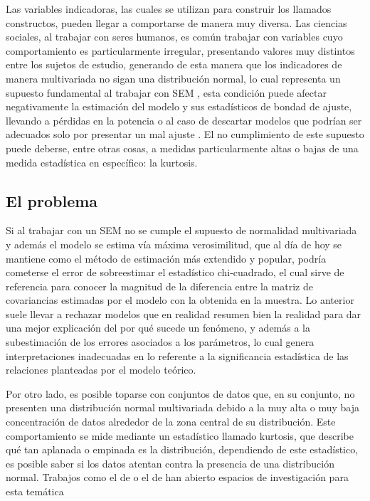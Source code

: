 \documentclass[english]{revcoles}
\begin{document}
Las variables indicadoras, las cuales se utilizan para construir los llamados constructos, pueden llegar a comportarse de manera muy diversa. Las ciencias sociales, al trabajar con seres humanos, es común trabajar con variables cuyo comportamiento es particularmente irregular, presentando valores muy distintos entre los sujetos de estudio, generando de esta manera que los indicadores de manera multivariada no sigan una distribución normal, lo cual representa un supuesto fundamental al trabajar con SEM \cite{SuraFonseca2020}, esta condición puede afectar negativamente la estimación del modelo y sus estadísticos de bondad de ajuste, llevando a pérdidas en la potencia \cite{Foss2011} o al caso de descartar modelos que podrían ser adecuados solo por presentar un mal ajuste \cite{Andreassen2006}. El no cumplimiento de este supuesto puede deberse, entre otras cosas, a medidas particularmente altas o bajas de una medida estadística en específico: la kurtosis.

\subsection{El problema}

Si al trabajar con un SEM no se cumple el supuesto de normalidad multivariada y además el modelo se estima vía máxima verosimilitud, que al día de hoy se mantiene como el método de estimación más extendido y popular, podría cometerse el error de sobreestimar el estadístico chi-cuadrado, el cual sirve de referencia para conocer la magnitud de la diferencia entre la matriz de covariancias estimadas por el modelo con la obtenida en la muestra. Lo anterior suele llevar a rechazar modelos que en realidad resumen bien la realidad para dar una mejor explicación del por qué sucede un fenómeno, y además a la subestimación de los errores asociados a los parámetros, lo cual genera interpretaciones inadecuadas en lo referente a la significancia estadística de las relaciones planteadas por el modelo teórico.

Por otro lado, es posible toparse con conjuntos de datos que, en su conjunto, no presenten una distribución normal multivariada debido a la muy alta o muy baja concentración de datos alrededor de la zona central de su distribución. Este comportamiento se mide mediante un estadístico llamado kurtosis, que describe qué tan aplanada o empinada es la distribución, dependiendo de este estadístico, es posible saber si los datos atentan contra la presencia de una distribución normal. Trabajos como el de  o el de  han abierto espacios de investigación para esta temática
\end{document}
